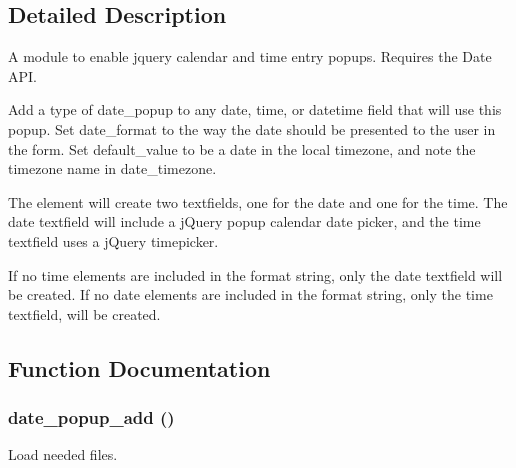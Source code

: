 \subsection{Detailed Description}
A module to enable jquery calendar and time entry popups. Requires the Date API.

Add a type of date\_\-popup to any date, time, or datetime field that will use this popup. Set date\_\-format to the way the date should be presented to the user in the form. Set default\_\-value to be a date in the local timezone, and note the timezone name in date\_\-timezone.

The element will create two textfields, one for the date and one for the time. The date textfield will include a jQuery popup calendar date picker, and the time textfield uses a jQuery timepicker.

If no time elements are included in the format string, only the date textfield will be created. If no date elements are included in the format string, only the time textfield, will be created. 

\subsection{Function Documentation}
\hypertarget{date__popup_8module_a060827559885c3a2052e96d116f24f69}{
\subsubsection[{date\_\-popup\_\-add}]{\setlength{\rightskip}{0pt plus 5cm}date\_\-popup\_\-add ()}}
\label{date__popup_8module_a060827559885c3a2052e96d116f24f69}
Load needed files.

